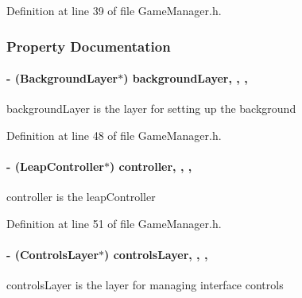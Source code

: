 Definition at line 39 of file Game\-Manager.\-h.



\subsubsection{Property Documentation}
\hypertarget{interface_game_manager_a2a3a96f1202b13592f244cf1402b4051}{
\paragraph[{background\-Layer}]{\setlength{\rightskip}{0pt plus 5cm}-\/ ({\bf Background\-Layer}$\ast$) background\-Layer\hspace{0.3cm}{\ttfamily [read]}, {\ttfamily [write]}, {\ttfamily [nonatomic]}, {\ttfamily [strong]}}}\label{d4/d94/interface_game_manager_a2a3a96f1202b13592f244cf1402b4051}
background\-Layer is the layer for setting up the background 

Definition at line 48 of file Game\-Manager.\-h.

\hypertarget{interface_game_manager_a4b089253ae3569099d28535b128f3436}{
\paragraph[{controller}]{\setlength{\rightskip}{0pt plus 5cm}-\/ (Leap\-Controller$\ast$) controller\hspace{0.3cm}{\ttfamily [read]}, {\ttfamily [write]}, {\ttfamily [nonatomic]}, {\ttfamily [strong]}}}\label{d4/d94/interface_game_manager_a4b089253ae3569099d28535b128f3436}
controller is the leap\-Controller 

Definition at line 51 of file Game\-Manager.\-h.

\hypertarget{interface_game_manager_a0ee5903be06e4a676ddde4c1f03530a7}{
\paragraph[{controls\-Layer}]{\setlength{\rightskip}{0pt plus 5cm}-\/ ({\bf Controls\-Layer}$\ast$) controls\-Layer\hspace{0.3cm}{\ttfamily [read]}, {\ttfamily [write]}, {\ttfamily [nonatomic]}, {\ttfamily [strong]}}}\label{d4/d94/interface_game_manager_a0ee5903be06e4a676ddde4c1f03530a7}
controls\-Layer is the layer for managing interface controls 


